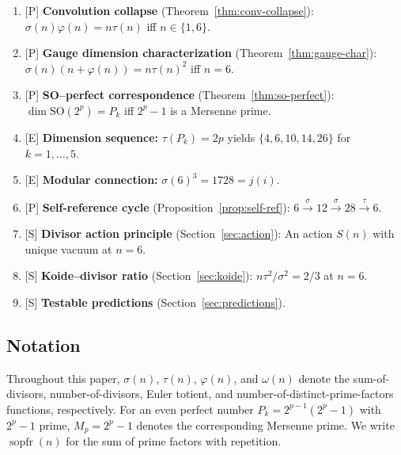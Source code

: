 \documentclass[11pt,letterpaper]{article}
\theoremstyle{definition}
\theoremstyle{remark}
\newcommand{\proven}{\textsf{[P]}}
\newcommand{\established}{\textsf{[E]}}
\newcommand{\speculative}{\textsf{[S]}}
\begin{document}
\begin{enumerate}
\item \proven{} \textbf{Convolution collapse} (Theorem~\ref{thm:conv-collapse}):
$\sigma(n)\varphi(n) = n\tau(n)$ iff $n \in \{1,6\}$.

\item \proven{} \textbf{Gauge dimension characterization} (Theorem~\ref{thm:gauge-char}):
$\sigma(n)(n+\varphi(n)) = n\tau(n)^2$ iff $n = 6$.

\item \proven{} \textbf{SO--perfect correspondence} (Theorem~\ref{thm:so-perfect}):
$\dim\mathrm{SO}(2^p) = P_k$ iff $2^p-1$ is a Mersenne prime.

\item \established{} \textbf{Dimension sequence:}
$\tau(P_k) = 2p$ yields $\{4,6,10,14,26\}$ for $k=1,\ldots,5$.

\item \established{} \textbf{Modular connection:}
$\sigma(6)^3 = 1728 = j(i)$.

\item \proven{} \textbf{Self-reference cycle} (Proposition~\ref{prop:self-ref}):
$6 \xrightarrow{\sigma} 12 \xrightarrow{\sigma} 28 \xrightarrow{\tau} 6$.

\item \speculative{} \textbf{Divisor action principle} (Section~\ref{sec:action}):
An action $S(n)$ with unique vacuum at $n=6$.

\item \speculative{} \textbf{Koide--divisor ratio} (Section~\ref{sec:koide}):
$n\tau^2/\sigma^2 = 2/3$ at $n=6$.

\item \speculative{} \textbf{Testable predictions} (Section~\ref{sec:predictions}).
\end{enumerate}

\subsection{Notation}

Throughout this paper, $\sigma(n)$, $\tau(n)$, $\varphi(n)$, and $\omega(n)$ 
denote the sum-of-divisors, number-of-divisors, Euler totient, and 
number-of-distinct-prime-factors functions, respectively. 
For an even perfect number $P_k = 2^{p-1}(2^p-1)$ with $2^p-1$ prime, 
$M_p = 2^p - 1$ denotes the corresponding Mersenne prime. 
We write $\operatorname{sopfr}(n)$ for the sum of prime factors with repetition.
\end{document}
